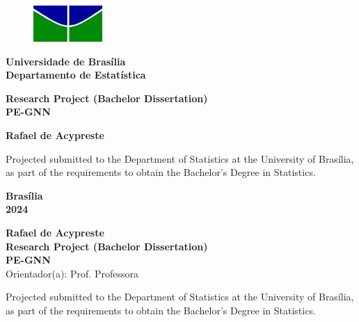 \documentclass[12pt, a4paper, twoside]{article}
\numberwithin{equation}{subsection} %
\newcommand{\titulo}{Research Project (Bachelor Dissertation) \\ PE-GNN}
\newcommand{\autor}{Rafael de Acypreste}
\newcommand{\orientador}{ Prof. Professora }
\newcommand{\coorientador}{ Prof(a).  }
\begin{document}
\begin{titlepage}
\begin{center}
\begin{figure}[h!]
	\centering
		\includegraphics[scale = 0.8]{img/unb.png}
	\label{fig:unb}
\end{figure}
{\bf Universidade de Brasília \\
\bf Departamento de Estatística}
\vspace{5cm}

\setcounter{page}{0}
\null
\textbf{\titulo}
\vspace{2.5cm}


\vspace{0.2cm}
\textbf{\autor}
\end{center}
\vspace{1.5cm}

\begin{flushright}
\begin{minipage}{7.5cm}
\parbox[t]{7.5cm}{Projected submitted to the Department of Statistics at
the University of Brasília, as part of the requirements to obtain the
Bachelor's Degree in Statistics.}
\end{minipage}
\end{flushright}

\vspace{5cm}

\begin{center}
{\bf{Brasília} \\ }
\bf{2024}
\end{center}
\end{titlepage}



\thispagestyle{empty}

\begin{center}
\textbf{\autor} \\
\vspace{5cm}
\textbf{\titulo} \\
\vspace{3cm}
\small
Orientador(a): \orientador \\
\end{center}


\vspace*{3cm}

\begin{flushright}
\begin{minipage}{7.5cm}
 \parbox[t]{7.5cm}{Projected submitted to the Department of Statistics
at the University of Brasília, as part of the requirements to obtain the
Bachelor's Degree in Statistics.}
\end{minipage}
\end{flushright}
\end{document}
